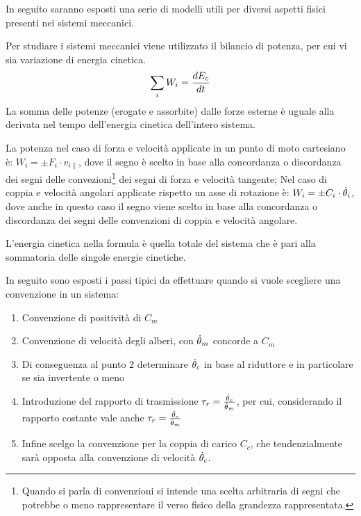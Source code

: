 In seguito saranno esposti una serie di modelli utili per diversi aspetti fisici presenti nei sistemi meccanici.

Per studiare i sistemi meccanici viene utilizzato il bilancio di potenza, per cui vi sia variazione di energia cinetica.
\[\sum_i W_i = \frac{dE_c}{dt}\]
La somma delle potenze (erogate e assorbite) dalle forze esterne è uguale alla derivata nel tempo dell'energia cinetica dell'intero sistema.

La potenza nel caso di forza e velocità applicate in un punto di moto cartesiano è: $W_i=\pm F_i \cdot v_{i\parallel}$, dove il segno è scelto in base alla concordanza o discordanza dei segni delle convezioni\footnote{Quando si parla di convenzioni si intende una scelta arbitraria di segni che potrebbe o meno rappresentare il verso fisico della grandezza rappresentata.} dei segni di forza e velocità tangente;
Nel caso di coppia e velocità angolari applicate rispetto un asse di rotazione è: $W_i = \pm C_i \cdot \dot{\theta}_i$, dove anche in questo caso il segno viene scelto in base alla concordanza o discordanza dei segni delle convenzioni di coppia e velocità angolare.

L'energia cinetica nella formula è quella totale del sistema che è pari alla sommatoria delle singole energie cinetiche.

In seguito sono esposti i passi tipici da effettuare quando si vuole scegliere una convenzione in un sistema:

\begin{enumerate}
    \item Convenzione di positività di $C_m$
    \item Convenzione di velocità degli alberi, con $\dot{\theta}_m$ concorde a $C_m$
    \item Di conseguenza al punto 2 determinare $\dot{\theta}_c$ in base al riduttore e in particolare se sia invertente o meno
    \item Introduzione del rapporto di trasmissione $\tau_r=\frac{\dot{\theta}_c}{\dot{\theta}_m}$, per cui, considerando il rapporto costante vale anche $\tau_r=\frac{\Ddot{\theta}_c}{\Ddot{\theta}_m}$
    \item Infine scelgo la convenzione per la coppia di carico $C_c$, che tendenzialmente sarà opposta alla convenzione di velocità $\dot{\theta}_c$.
\end{enumerate}

